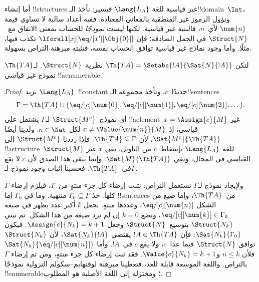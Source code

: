 \documentclass[../../../include/open-logic-section]{subfiles}
\begin{document}
\begin{explain}
أما إنشاء !!{structure}s غير قياسية للغة $\Lang{L_A}$
فيسير: نأخذ الـ!!{domain}~$\Int$، ونؤول الرموز غير المنطقية
بالمعاني المعتادة. ففيه أعداد سالبة لا تساوي قيمة
$\num{n}$ لأي~$n$، فالبنية غير قياسية. لكنها ليست
\emph{نموذجًا} للحساب بمعنى الاتفاق مع~$\Struct{N}$ في الجمل
الصادقة؛ فإن $\lforall[x][\eq/[x'][\Obj{0}]]$ تكذب فيها،
مثلًا. وأما وجود نماذج غير قياسية توافق الحساب نفسه،
فتثبته مبرهنة التراص بسهولة.
\end{explain}

\begin{prop}
لتكن $\Th{TA} = \Setabs{!A}{\Sat{N}{!A}}$ نظرية~$\Struct{N}$.
لـ$\Th{TA}$ نموذج غير قياسي !!a{enumerable}.
\end{prop}

\begin{proof}
نزيد $\Lang{L_A}$~!!{constant} جديدًا~$c$، ونأخذ
مجموعة الـ!!{sentence}s
\[
\Gamma = \Th{TA} \cup \{\eq/[c][\num{0}], \eq/[c][\num{1}],
\eq/[c][\num{2}], \dots\}.
\]
أي نموذج~$\Struct{M^c}$ لـ$\Gamma$ يشتمل على
!!a{element}~$x =
\Assign{c}{M}$ غير قياسي، إذ $x \neq \Value{\num{n}}{M}$
لكل $n \in \Nat$. ولدينا أيضًا $\Sat{M^c}{\Th{TA}}$،
لأن $\Th{TA} \subseteq \Gamma$. فإذا رددنا $\Struct{M^c}$
إلى !!a{structure}~$\Struct{M}$ للغة $\Lang{L_A}$ بإسقاط~$c$
من التأويل، بقي $x$ غير القياسي في المجال، وبقي
$\Sat{M}{\Th{TA}}$. وإنما يبقى هذا الصدق لأن $c$
لا يقع في~$\Th{TA}$. فحسبنا إثبات وجود نموذج لـ$\Gamma$.

ولإيجاد نموذج لـ$\Gamma$ نستعمل التراص: نثبت إرضاء كل جزء
منتهٍ من~$\Gamma$، فيلزم إرضاء $\Gamma$ كلها. خذ
$\Gamma_0 \subseteq \Gamma$ منتهية. وما في $\Gamma_0$
إما !!{sentence}s من~$\Th{TA}$، وإما صيغ من الشكل
$\eq/[c][\num{n}]$، وعددها منتهٍ. نجعل $k$ أكبر عدد
يظهر في صيغة $\eq/[c][\num{k}] \in \Gamma_0$، ونضع $k=0$
إن لم ترد صيغة من هذا الشكل. ثم نبني $\Struct{N_k}$
بتوسيع~$\Struct{N}$ وجعل $\Assign{c}{N_k}=k+1$.
فيكون $\Sat{N_k}{\Gamma_0}$: فإن $!A \in \Th{TA}$
يقتضي $\Sat{N_k}{!A}$، لأن $\Struct{N_k}$ توافق
$\Struct{N}$ فيما عدا~$c$، ولا يقع $c$ في~$!A$.
وأما $\Sat{N_k}{\eq/[c][\num{n}]}$ فلأن $n \le k$
و$\Value{c}{N_k}=k+1$. فقد ثبت إرضاء كل جزء منتهٍ،
ومن ثم إرضاء $\Gamma$ بالتراص. واللغة الموسعة قابلة للعد،
فتعطينا مبرهنة لوفنهايم--سكولم النزولية نموذجًا !!{enumerable}؛
ومختزله إلى اللغة الأصلية هو المطلوب.
\end{proof}
\end{document}
